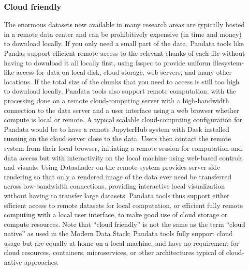 \subsubsection{Cloud friendly}
The enormous datasets now available in many research areas are typically hosted in a remote data center and can be prohibitively expensive (in time and money) to download locally. If you only need a small part of the data, Pandata tools like Pandas support efficient remote access to the relevant chunks of each file without having to download it all locally first, using fsspec to provide uniform filesystem-like access for data on local disk, cloud storage, web servers, and many other locations. If the total size of the chunks that you need to access is still too high to download locally, Pandata tools also support remote computation, with the processing done on a remote cloud-computing server with a high-bandwidth connection to the data server and a user interface using a web browser whether compute is local or remote.  A typical scalable cloud-computing configuration for Pandata would be to have a remote JupyterHub system with Dask installed running on the cloud server close to the data. Users then contact the remote system from their local browser, initiating a remote session for computation and data access but with interactivity on the local machine using web-based controls and visuals. Using Datashader on the remote system provides server-side rendering so that only a rendered image of the data ever need be transferred across low-bandwidth connections, providing interactive local visualization without having to transfer large datasets. Pandata tools thus support either efficient access to remote datasets for local computation, or efficient fully remote computing with a local user interface, to make good use of cloud storage or compute resources. Note that ``cloud friendly'' is not the same as the term ``cloud native'' as used in the Modern Data Stack; Pandata tools fully support cloud usage but are equally at home on a local machine, and have no requirement for cloud resources, containers, microservices, or other architectures typical of cloud-native approaches.

